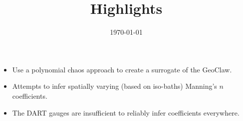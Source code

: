 \documentclass[]{article}
\title{Highlights}
\author{}
\date{\today}
\begin{document}
\ifpdf
{}
\else
{}
\fi

\begin{itemize}
    \item Use a polynomial chaos approach to create a surrogate of the GeoClaw.
    \item Attempts to infer spatially varying (based on iso-baths) Manning's $n$ coefficients.
    \item The DART gauges are insufficient to reliably infer coefficients everywhere.
\end{itemize}
\end{document}
